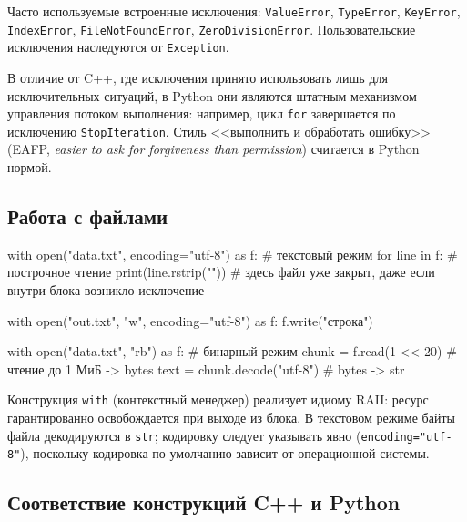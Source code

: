\documentclass[11pt,a4paper]{article}
\newcommand{\code}[1]{\texttt{#1}}
\begin{document}
Часто используемые встроенные исключения: \code{ValueError}, \code{TypeError},
\code{KeyError}, \code{IndexError}, \code{FileNotFoundError}, \code{ZeroDivisionError}.
Пользовательские исключения наследуются от \code{Exception}.

В отличие от C++, где исключения принято использовать лишь для исключительных ситуаций,
в Python они являются штатным механизмом управления потоком выполнения: например, цикл
\code{for} завершается по исключению \code{StopIteration}. Стиль <<выполнить и обработать
ошибку>> (EAFP, \emph{easier to ask for forgiveness than permission}) считается в Python нормой.

\subsection{Работа с файлами}

\begin{py}
with open("data.txt", encoding="utf-8") as f:       # текстовый режим
    for line in f:                                  # построчное чтение
        print(line.rstrip("\n"))
# здесь файл уже закрыт, даже если внутри блока возникло исключение

with open("out.txt", "w", encoding="utf-8") as f:
    f.write("строка\n")

with open("data.txt", "rb") as f:                   # бинарный режим
    chunk = f.read(1 << 20)                         # чтение до 1 МиБ -> bytes
    text = chunk.decode("utf-8")                    # bytes -> str
\end{py}

Конструкция \code{with} (контекстный менеджер) реализует идиому RAII: ресурс гарантированно
освобождается при выходе из блока. В текстовом режиме байты файла декодируются в \code{str};
кодировку следует указывать явно (\code{encoding="utf-8"}), поскольку кодировка по умолчанию
зависит от операционной системы.

\subsection{Соответствие конструкций C++ и Python}
\end{document}
